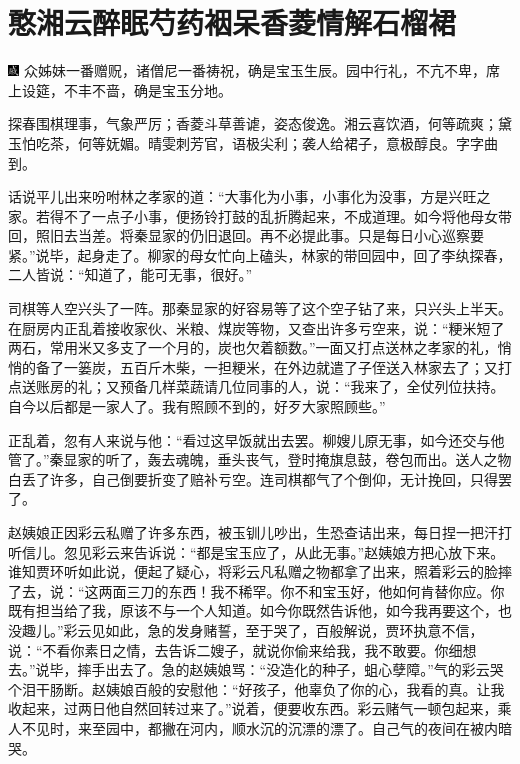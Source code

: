 
\chapter{憨湘云醉眠芍药裀\hspace{.5em}呆香菱情解石榴裙}

{\includegraphics[width=3mm]{../Images/00005}  \kaishu 众姊妹一番赠}贶{，诸僧尼一番祷祝，确是宝玉生辰。园中行礼，不亢不卑，席上设筵，不丰不啬，确是宝玉分地。}

{探春围棋理事，气象严厉；香菱斗草善谑，姿态俊逸。湘云喜饮酒，何等疏爽；黛玉怕吃茶，何等妩媚。晴雯刺芳官，语极尖利；袭人给裙子，意极醇良。字字曲到。}

话说平儿出来吩咐林之孝家的道：``大事化为小事，小事化为没事，方是兴旺之家。若得不了一点子小事，便扬铃打鼓的乱折腾起来，不成道理。如今将他母女带回，照旧去当差。将秦显家的仍旧退回。再不必提此事。只是每日小心巡察要紧。''说毕，起身走了。柳家的母女忙向上磕头，林家的带回园中，回了李纨探春，二人皆说：``知道了，能可无事，很好。''

司棋等人空兴头了一阵。那秦显家的好容易等了这个空子钻了来，只兴头上半天。在厨房内正乱着接收家伙、米粮、煤炭等物，又查出许多亏空来，说：``粳米短了两石，常用米又多支了一个月的，炭也欠着额数。''一面又打点送林之孝家的礼，悄悄的备了一篓炭，五百斤木柴，一担粳米，在外边就遣了子侄送入林家去了；又打点送账房的礼；又预备几样菜蔬请几位同事的人，说：``我来了，全仗列位扶持。自今以后都是一家人了。我有照顾不到的，好歹大家照顾些。''

正乱着，忽有人来说与他：``看过这早饭就出去罢。柳嫂儿原无事，如今还交与他管了。''秦显家的听了，轰去魂魄，垂头丧气，登时掩旗息鼓，卷包而出。送人之物白丢了许多，自己倒要折变了赔补亏空。连司棋都气了个倒仰，无计挽回，只得罢了。

赵姨娘正因彩云私赠了许多东西，被玉钏儿吵出，生恐查诘出来，每日捏一把汗打听信儿。忽见彩云来告诉说：``都是宝玉应了，从此无事。''赵姨娘方把心放下来。谁知贾环听如此说，便起了疑心，将彩云凡私赠之物都拿了出来，照着彩云的脸摔了去，说：``这两面三刀的东西！我不稀罕。你不和宝玉好，他如何肯替你应。你既有担当给了我，原该不与一个人知道。如今你既然告诉他，如今我再要这个，也没趣儿。''彩云见如此，急的发身赌誓，至于哭了，百般解说，贾环执意不信，说：``不看你素日之情，去告诉二嫂子，就说你偷来给我，我不敢要。你细想去。''说毕，摔手出去了。急的赵姨娘骂：``没造化的种子，蛆心孽障。''气的彩云哭个泪干肠断。赵姨娘百般的安慰他：``好孩子，他辜负了你的心，我看的真。让我收起来，过两日他自然回转过来了。''说着，便要收东西。彩云赌气一顿包起来，乘人不见时，来至园中，都撇在河内，顺水沉的沉漂的漂了。自己气的夜间在被内暗哭。

